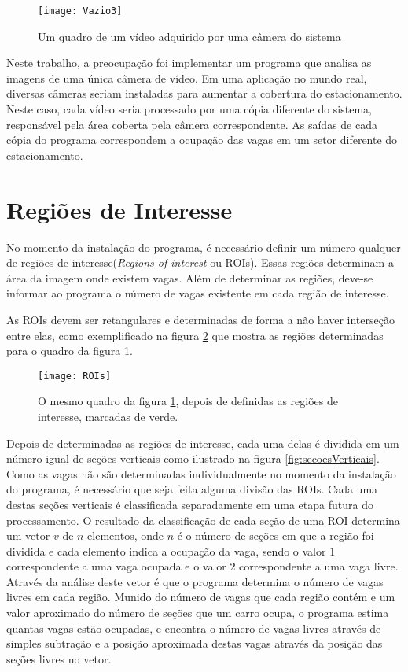 \begin{figure}[!ht]
	\centering
	\texttt{[image: Vazio3]}
	\label{fig:aquisicao}
	\caption{Um quadro de um vídeo adquirido por uma câmera do sistema}
	\centering
\end{figure}

Neste trabalho, a preocupação foi implementar um programa que analisa as imagens de uma única câmera de vídeo. Em uma aplicação no mundo real, diversas câmeras seriam instaladas para aumentar a cobertura do estacionamento. Neste caso, cada vídeo seria processado por uma cópia diferente do sistema, responsável pela área coberta pela câmera correspondente. As saídas de cada cópia do programa correspondem a ocupação das vagas em um setor diferente do estacionamento.

\section{Regiões de Interesse}\label{sec:ROIs}

No momento da instalação do programa, é necessário definir um número qualquer de regiões de interesse(\textit{Regions of interest} ou ROIs). Essas regiões determinam a área da imagem onde existem vagas. Além de determinar as regiões, deve-se informar ao programa o número de vagas existente em cada região de interesse.

As ROIs devem ser retangulares e determinadas de forma a não haver interseção entre elas, como exemplificado na figura \ref{fig:ROIs} que mostra as regiões determinadas para o quadro da figura \ref{fig:aquisicao}.

\begin{figure}
	\centering
	\texttt{[image: ROIs]}
	\label{fig:ROIs}
	\caption{O mesmo quadro da figura \ref{fig:aquisicao}, depois de definidas as regiões de interesse, marcadas de verde.}
	\centering
\end{figure}

Depois de determinadas as regiões de interesse, cada uma delas é dividida em um número igual de seções verticais como ilustrado na figura \ref{fig:secoesVerticais}. Como as vagas não são determinadas individualmente no momento da instalação do programa, é necessário que seja feita alguma divisão das ROIs. Cada uma destas seções verticais é classificada separadamente em uma etapa futura do processamento. O resultado da classificação de cada seção de uma ROI determina um vetor $v$ de $n$ elementos, onde $n$ é o número de seções em que a região foi dividida e cada elemento indica a ocupação da vaga, sendo o valor $1$ correspondente a uma vaga ocupada e o valor $2$ correspondente a uma vaga livre. Através da análise deste vetor é que o programa determina o número de vagas livres em cada região. Munido do número de vagas que cada região contém e um valor aproximado do número de seções que um carro ocupa, o programa estima quantas vagas estão ocupadas, e encontra o número de vagas livres através de simples subtração e a posição aproximada destas vagas através da posição das seções livres no vetor.

